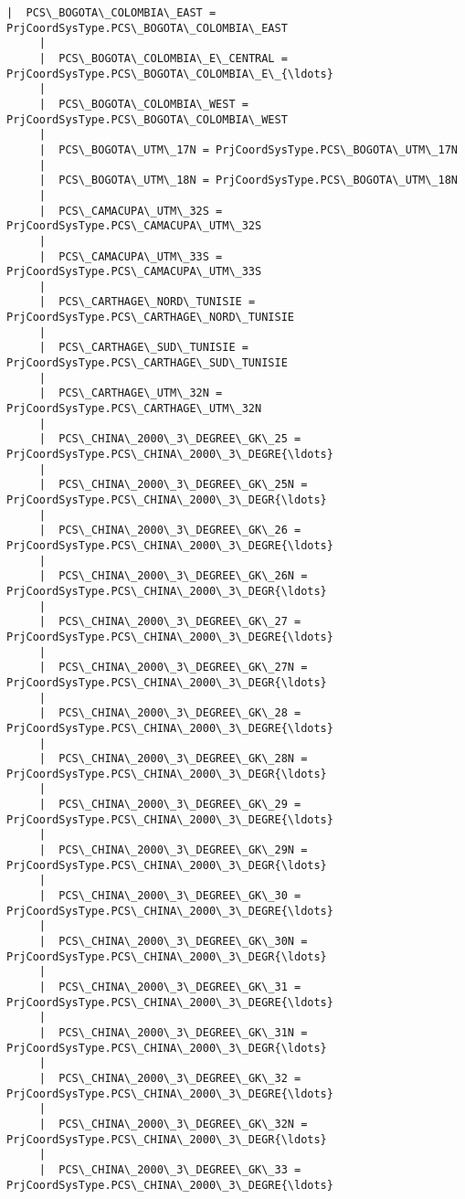 \documentclass[11pt]{article}
\begin{document}
\begin{Verbatim}[commandchars=\\\{\}]
     |  PCS\_BOGOTA\_COLOMBIA\_EAST = PrjCoordSysType.PCS\_BOGOTA\_COLOMBIA\_EAST
     |  
     |  PCS\_BOGOTA\_COLOMBIA\_E\_CENTRAL = PrjCoordSysType.PCS\_BOGOTA\_COLOMBIA\_E\_{\ldots}
     |  
     |  PCS\_BOGOTA\_COLOMBIA\_WEST = PrjCoordSysType.PCS\_BOGOTA\_COLOMBIA\_WEST
     |  
     |  PCS\_BOGOTA\_UTM\_17N = PrjCoordSysType.PCS\_BOGOTA\_UTM\_17N
     |  
     |  PCS\_BOGOTA\_UTM\_18N = PrjCoordSysType.PCS\_BOGOTA\_UTM\_18N
     |  
     |  PCS\_CAMACUPA\_UTM\_32S = PrjCoordSysType.PCS\_CAMACUPA\_UTM\_32S
     |  
     |  PCS\_CAMACUPA\_UTM\_33S = PrjCoordSysType.PCS\_CAMACUPA\_UTM\_33S
     |  
     |  PCS\_CARTHAGE\_NORD\_TUNISIE = PrjCoordSysType.PCS\_CARTHAGE\_NORD\_TUNISIE
     |  
     |  PCS\_CARTHAGE\_SUD\_TUNISIE = PrjCoordSysType.PCS\_CARTHAGE\_SUD\_TUNISIE
     |  
     |  PCS\_CARTHAGE\_UTM\_32N = PrjCoordSysType.PCS\_CARTHAGE\_UTM\_32N
     |  
     |  PCS\_CHINA\_2000\_3\_DEGREE\_GK\_25 = PrjCoordSysType.PCS\_CHINA\_2000\_3\_DEGRE{\ldots}
     |  
     |  PCS\_CHINA\_2000\_3\_DEGREE\_GK\_25N = PrjCoordSysType.PCS\_CHINA\_2000\_3\_DEGR{\ldots}
     |  
     |  PCS\_CHINA\_2000\_3\_DEGREE\_GK\_26 = PrjCoordSysType.PCS\_CHINA\_2000\_3\_DEGRE{\ldots}
     |  
     |  PCS\_CHINA\_2000\_3\_DEGREE\_GK\_26N = PrjCoordSysType.PCS\_CHINA\_2000\_3\_DEGR{\ldots}
     |  
     |  PCS\_CHINA\_2000\_3\_DEGREE\_GK\_27 = PrjCoordSysType.PCS\_CHINA\_2000\_3\_DEGRE{\ldots}
     |  
     |  PCS\_CHINA\_2000\_3\_DEGREE\_GK\_27N = PrjCoordSysType.PCS\_CHINA\_2000\_3\_DEGR{\ldots}
     |  
     |  PCS\_CHINA\_2000\_3\_DEGREE\_GK\_28 = PrjCoordSysType.PCS\_CHINA\_2000\_3\_DEGRE{\ldots}
     |  
     |  PCS\_CHINA\_2000\_3\_DEGREE\_GK\_28N = PrjCoordSysType.PCS\_CHINA\_2000\_3\_DEGR{\ldots}
     |  
     |  PCS\_CHINA\_2000\_3\_DEGREE\_GK\_29 = PrjCoordSysType.PCS\_CHINA\_2000\_3\_DEGRE{\ldots}
     |  
     |  PCS\_CHINA\_2000\_3\_DEGREE\_GK\_29N = PrjCoordSysType.PCS\_CHINA\_2000\_3\_DEGR{\ldots}
     |  
     |  PCS\_CHINA\_2000\_3\_DEGREE\_GK\_30 = PrjCoordSysType.PCS\_CHINA\_2000\_3\_DEGRE{\ldots}
     |  
     |  PCS\_CHINA\_2000\_3\_DEGREE\_GK\_30N = PrjCoordSysType.PCS\_CHINA\_2000\_3\_DEGR{\ldots}
     |  
     |  PCS\_CHINA\_2000\_3\_DEGREE\_GK\_31 = PrjCoordSysType.PCS\_CHINA\_2000\_3\_DEGRE{\ldots}
     |  
     |  PCS\_CHINA\_2000\_3\_DEGREE\_GK\_31N = PrjCoordSysType.PCS\_CHINA\_2000\_3\_DEGR{\ldots}
     |  
     |  PCS\_CHINA\_2000\_3\_DEGREE\_GK\_32 = PrjCoordSysType.PCS\_CHINA\_2000\_3\_DEGRE{\ldots}
     |  
     |  PCS\_CHINA\_2000\_3\_DEGREE\_GK\_32N = PrjCoordSysType.PCS\_CHINA\_2000\_3\_DEGR{\ldots}
     |  
     |  PCS\_CHINA\_2000\_3\_DEGREE\_GK\_33 = PrjCoordSysType.PCS\_CHINA\_2000\_3\_DEGRE{\ldots}

\end{Verbatim}
\end{document}
